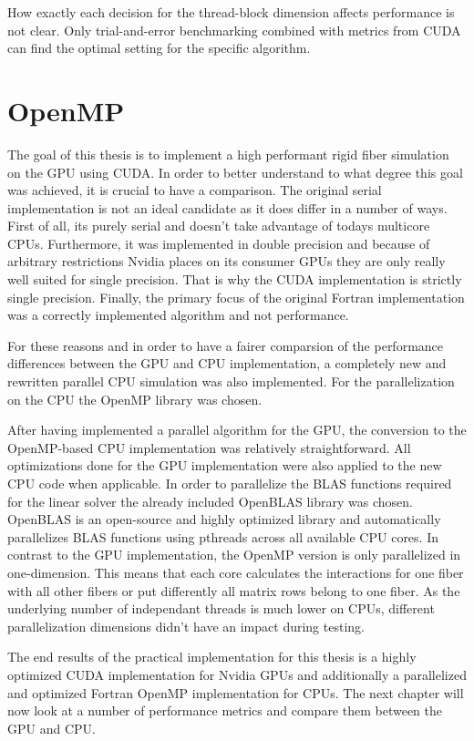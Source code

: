\documentclass[a4paper,11pt]{kth-mag}
\begin{document}
How exactly each decision for the thread-block dimension affects performance is not clear. Only trial-and-error benchmarking combined with metrics from CUDA can find the optimal setting for the specific algorithm.

\section{OpenMP}

The goal of this thesis is to implement a high performant rigid fiber simulation on the GPU using CUDA. In order to better understand to what degree this goal was achieved, it is crucial to have a comparison. The original serial implementation is not an ideal candidate as it does differ in a number of ways. First of all, its purely serial and doesn't take advantage of todays multicore CPUs. Furthermore, it was implemented in double precision and because of arbitrary restrictions Nvidia places on its consumer GPUs they are only really well suited for single precision. That is why the CUDA implementation is strictly single precision. Finally, the primary focus of the original Fortran implementation was a correctly implemented algorithm and not performance.

For these reasons and in order to have a fairer comparsion of the performance differences between the GPU and CPU implementation, a completely new and rewritten parallel CPU simulation was also implemented. For the parallelization on the CPU the OpenMP library was chosen.

After having implemented a parallel algorithm for the GPU, the conversion to the OpenMP-based CPU implementation was relatively straightforward. All optimizations done for the GPU implementation were also applied to the new CPU code when applicable. In order to parallelize the BLAS functions required for the linear solver the already included OpenBLAS library was chosen. OpenBLAS is an open-source and highly optimized library and automatically parallelizes BLAS functions using pthreads across all available CPU cores. In contrast to the GPU implementation, the OpenMP version is only parallelized in one-dimension. This means that each core calculates the interactions for one fiber with all other fibers or put differently all matrix rows belong to one fiber. As the underlying number of independant threads is much lower on CPUs, different parallelization dimensions didn't have an impact during testing.

The end results of the practical implementation for this thesis is a highly optimized CUDA implementation for Nvidia GPUs and additionally a parallelized and optimized Fortran OpenMP implementation for CPUs. The next chapter will now look at a number of performance metrics and compare them between the GPU and CPU.
\end{document}
